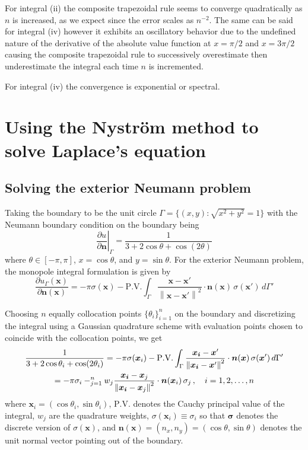 \documentclass[11pt]{article}
\let\sumop\relax
\newcommand\p[2]{\frac{\partial #1}{\partial #2}}
\newcommand{\norm}[1]{\left\lVert#1\right\rVert}
\begin{document}
For integral (ii) the composite trapezoidal rule seems to converge quadratically as $n$ is increased, as we expect since the error scales as $n^{-2}$. The same can be said for integral (iv) however it exhibits an oscillatory behavior due to the undefined nature of the derivative of the absolute value function at $x=\pi/2$ and $x=3\pi/2$ causing the composite trapezoidal rule to successively overestimate then underestimate the integral each time $n$ is incremented.

For integral (iv) the convergence is exponential or spectral.

\section{Using the Nyström method to solve Laplace's equation}

\subsection{Solving the exterior Neumann problem}
Taking the boundary to be the unit circle $\Gamma = \{(x,y) : \sqrt{x^2 + y^2} = 1\}$ with the Neumann boundary condition on the boundary being
\begin{equation}
  \left. \p{u}{\bm{n}} \right\rvert_\Gamma =  \frac{1}{3 + 2\cos\theta + \cos(2\theta)}
\end{equation}
where $\theta \in [-\pi, \pi]$, $x = \cos\theta$, and $y = \sin\theta$. For the exterior Neumann problem, the monopole integral formulation is given by
\begin{equation}
  \p{u_\Gamma(\bm{x})}{\bm{n}(\bm{x})}
  = -\pi\sigma(\bm{x}) - \mathrm{P.V.}\int_\Gamma \frac{\bm{x-x'}}{\norm{\bm{x-x'}}^2} \cdot \bm{n}(\bm{x}) \, \sigma(\bm{x}') \, d\Gamma'
\end{equation}

Choosing $n$ equally collocation points $\{\theta_i\}_{i=1}^n$ on the boundary and discretizing the integral using a Gaussian quadrature scheme with evaluation points chosen to coincide with the collocation points, we get
\begin{multline*}
  \frac{1}{3 + 2\cos\theta_i + \cos(2\theta_i)}
  = -\pi\sigma(\bm{x}_i) - \mathrm{P.V.}\int_\Gamma \frac{\bm{x_i}-\bm{x}'}{\norm{\bm{x_i}-\bm{x}'}^2} \cdot \bm{n}(\bm{x}) \, \sigma(\bm{x}') \, d\Gamma' \\
  = -\pi \sigma_i - \sumop_{j=1}^n w_j \frac{\bm{x_i}-\bm{x}_j}{\norm{\bm{x_i}-\bm{x}_j}^2} \cdot \bm{n}(\bm{x}_i) \, \sigma_j  \, , \quad i = 1,2,\dots,n 
\end{multline*}
where $\bm{x}_i = (\cos\theta_i, \sin\theta_i)$, $\mathrm{P.V.}$ denotes the Cauchy principal value of the integral, $w_j$ are the quadrature weights, $\sigma(\bm{x}_i) \equiv \sigma_i$ so that $\bm{\sigma}$ denotes the discrete version of $\sigma(\bm{x})$, and $\bm{n}(\bm{x}) = (n_x, n_y) = (\cos\theta, \sin\theta)$ denotes the unit normal vector pointing out of the boundary.
\end{document}
